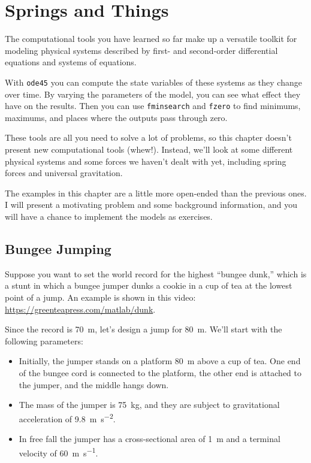 \chapter{Springs and Things}


The computational tools you have learned so far make up a versatile toolkit for modeling physical systems described by first- and second-order differential equations and systems of equations.

With \lstinline{ode45} you can compute the state variables of these systems as they change over time.
By varying the parameters of the model, you can see what effect they have on the results.
Then you can use \lstinline{fminsearch} and \lstinline{fzero} to find minimums, maximums, and places where the outputs pass through zero.

These tools are all you need to solve a lot of problems, so this chapter doesn't present new computational tools (whew!).  Instead, we'll look at some different physical systems and some forces we haven't dealt with yet, including spring forces and universal gravitation.

The examples in this chapter are a little more open-ended than the previous ones.
I will present a motivating problem and some background information, and you will have a chance to implement the models as exercises.


\section{Bungee Jumping}
\label{bungee}


Suppose you want to set the world record for the highest ``bungee dunk,'' which is a stunt in which a bungee jumper dunks a cookie in a cup of tea at the lowest point of a jump.  An example is shown in this video: \url{https://greenteapress.com/matlab/dunk}.

Since the record is \SI{70}{\meter}, let's design a jump for \SI{80}{\meter}.  We'll start with the following parameters:

\begin{itemize}

\item  Initially, the jumper stands on a platform \SI{80}{\meter} above a cup of tea.  One end of the bungee cord is connected to the platform, the other end is attached to the jumper, and the middle hangs down.

\item The mass of the jumper is \SI{75}{\kilogram}, and they are subject to gravitational acceleration of \SI{9.8}{\meter \per \second \squared}.

\item In free fall the jumper has a cross-sectional area of \SI{1}{\meter} and a terminal velocity of \SI{60}{\meter\per\second}.

\end{itemize}

